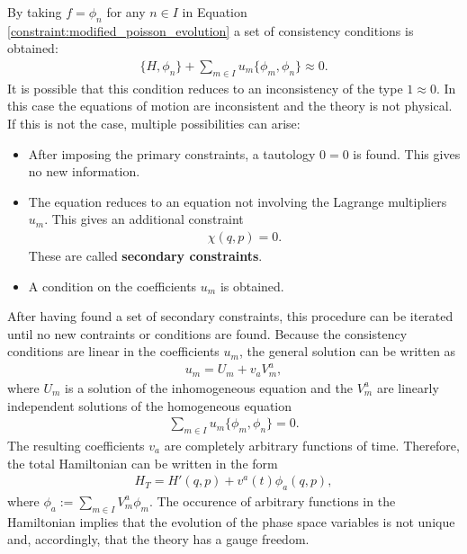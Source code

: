     \begin{property}
        By taking $f=\phi_n$ for any $n\in I$ in Equation \ref{constraint:modified_poisson_evolution} a set of consistency conditions is obtained:
        \begin{gather}
            \{H,\phi_n\} + \sum_{m\in I}u_m\{\phi_m,\phi_n\}\approx 0.
        \end{gather}
        It is possible that this condition reduces to an inconsistency of the type $1\approx0$. In this case the equations of motion are inconsistent and the theory is not physical. If this is not the case, multiple possibilities can arise:
        \begin{itemize}
            \item After imposing the primary constraints, a tautology $0=0$ is found. This gives no new information.
            \item The equation reduces to an equation not involving the Lagrange multipliers $u_m$. This gives an additional constraint
                \begin{gather}
                    \chi(q,p)=0.
                \end{gather}
                These are called \textbf{secondary constraints}.
            \item A condition on the coefficients $u_m$ is obtained.
        \end{itemize}
        After having found a set of secondary constraints, this procedure can be iterated until no new contraints or conditions are found. Because the consistency conditions are linear in the coefficients $u_m$, the general solution can be written as
        \begin{gather}
            u_m = U_m + v_aV^a _m,
        \end{gather}
        where $U_m$ is a solution of the inhomogeneous equation and the $V^a_m$ are linearly independent solutions of the homogeneous equation
        \begin{gather}
            \sum_{m\in I}u_m\{\phi_m,\phi_n\} = 0.
        \end{gather}
        The resulting coefficients $v_a$ are completely arbitrary functions of time. Therefore, the total Hamiltonian can be written in the form
        \begin{gather}
            H_T = H'(q,p) + v^a(t)\phi_a(q,p),
        \end{gather}
        where $\phi_a := \sum_{m\in I}V^a_m\phi_m$. The occurence of arbitrary functions in the Hamiltonian implies that the evolution of the phase space variables is not unique and, accordingly, that the theory has a gauge freedom.
    \end{property}

